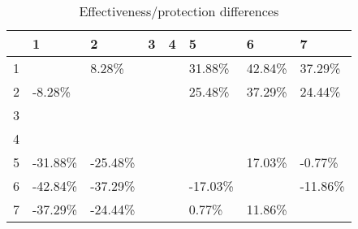 \begin{table}[ht]
\centering
\begin{tabular}{rlllllll}
  \hline
 & 1 & 2 & 3 & 4 & 5 & 6 & 7 \\ 
  \hline
1 &  & 8.28\% &  &  & 31.88\% & 42.84\% & 37.29\% \\ 
  2 & -8.28\% &  &  &  & 25.48\% & 37.29\% & 24.44\% \\ 
  3 &  &  &  &  &  &  &  \\ 
  4 &  &  &  &  &  &  &  \\ 
  5 & -31.88\% & -25.48\% &  &  &  & 17.03\% & -0.77\% \\ 
  6 & -42.84\% & -37.29\% &  &  & -17.03\% &  & -11.86\% \\ 
  7 & -37.29\% & -24.44\% &  &  & 0.77\% & 11.86\% &  \\ 
   \hline
\end{tabular}
\caption{Effectiveness/protection differences} 
\end{table}
